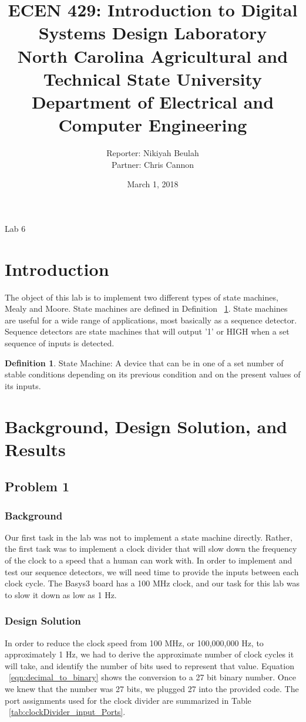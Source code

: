 \documentclass[11pt]{article}
\title {{\titleFont ECEN 429: Introduction to Digital Systems Design Laboratory \\ North Carolina Agricultural and Technical State University \\ Department of Electrical and Computer Engineering}} %
\author{\titleFont Reporter: Nikiyah Beulah\\ \titleFont Partner: Chris Cannon} %
\date{\titleFont March 1, 2018}
\begin{document}
\begin{titlingpage}
\maketitle
\begin{center}
	Lab 6
\end{center}
\end{titlingpage}

\section{Introduction}
The object of this lab is to implement two different types of state machines, Mealy and Moore. State machines are defined in Definition ~\ref{def:state_machine}. State machines are useful for a wide range of applications, most basically as a sequence detector. Sequence detectors are state machines that will output '1' or HIGH when a set sequence of inputs is detected.

\theoremstyle{definition}
\newtheorem{definition}{Definition}
\begin{definition}
State Machine: A device that can be in one of a set number of stable conditions depending on its previous condition and on the present values of its inputs.
\label{def:state_machine}
\end{definition}

\section{Background, Design Solution, and Results}

\subsection{Problem 1 }

\subsubsection{Background}
Our first task in the lab was not to implement a state machine directly. Rather, the first task was to implement a clock divider that will slow down the frequency of the clock to a speed that a human can work with. In order to implement and test our sequence detectors, we will need time to provide the inputs between each clock cycle. The Basys3 board has a 100 MHz clock, and our task for this lab was to slow it down as low as 1 Hz.

\subsubsection{Design Solution}
In order to reduce the clock speed from 100 MHz, or 100,000,000 Hz, to approximately 1 Hz, we had to derive the approximate number of clock cycles it will take, and identify the number of bits used to represent that value. Equation ~\ref{eqn:decimal_to_binary} shows the conversion to a 27 bit binary number. Once we knew that the number was 27 bits, we plugged 27 into the provided code. The port assignments used for the clock divider are summarized in Table ~\ref{tab:clockDivider_input_Ports}.
\end{document}

